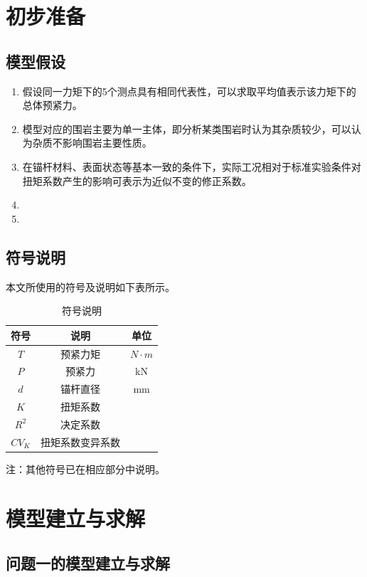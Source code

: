 \documentclass[UTF-8,a4paper,zihao=-4]{ctexart}
\begin{document}
\section{初步准备}
\subsection{模型假设}
\begin{enumerate}
    \item 假设同一力矩下的5个测点具有相同代表性，可以求取平均值表示该力矩下的总体预紧力。
    \item 模型对应的围岩主要为单一主体，即分析某类围岩时认为其杂质较少，可以认为杂质不影响围岩主要性质。
    \item 在锚杆材料、表面状态等基本一致的条件下，实际工况相对于标准实验条件对扭矩系数产生的影响可表示为近似不变的修正系数。
    \item 
    \item 
\end{enumerate}

\subsection{符号说明}
本文所使用的符号及说明如下表所示。
\begin{table}[H]
\centering
{}

\caption{符号说明}
\begin{tabular}{ccc}
\toprule
符号 & 说明 & 单位 \\
\midrule
$T$ & 预紧力矩 & $N\cdot m$ \\
$P$ & 预紧力 & kN \\
$d$ & 锚杆直径 & mm \\
$K$ & 扭矩系数\\
$R^2$ & 决定系数\\
$CV_K$ & 扭矩系数变异系数\\
\bottomrule
\end{tabular}

\vspace{0.5em}
\parbox{0.9\textwidth}{
注：其他符号已在相应部分中说明。
}
\end{table}

\section{模型建立与求解}
\subsection{问题一的模型建立与求解}
\end{document}
